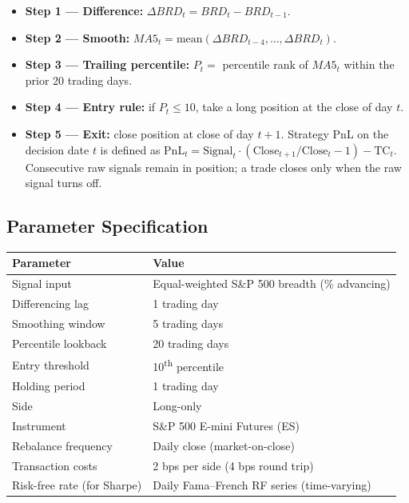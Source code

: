 \documentclass[11pt]{article}
\begin{document}
\begin{itemize}
\item \textbf{Step 1 --- Difference:}
  $\Delta BRD_t = BRD_t - BRD_{t-1}$.
\item \textbf{Step 2 --- Smooth:}
  $MA5_t = \text{mean}(\Delta BRD_{t-4}, \ldots, \Delta BRD_t)$.
\item \textbf{Step 3 --- Trailing percentile:}
  $P_t = $ percentile rank of $MA5_t$ within the prior 20 trading days.
\item \textbf{Step 4 --- Entry rule:}
  if $P_t \leq 10$, take a long position at the close of day $t$.
\item \textbf{Step 5 --- Exit:}
  close position at close of day $t{+}1$. Strategy PnL on the decision date
  $t$ is defined as
  $\text{PnL}_t = \text{Signal}_t \cdot (\text{Close}_{t+1}/\text{Close}_t - 1) - \text{TC}_t$.
  Consecutive raw signals remain in position; a trade closes only when the
  raw signal turns off.
\end{itemize}

\subsection{Parameter Specification}

\begin{center}
\small
\begin{tabular}{l l}
\toprule
\textbf{Parameter} & \textbf{Value}\\
\midrule
Signal input                 & Equal-weighted S\&P 500 breadth (\% advancing)\\
Differencing lag             & 1 trading day\\
Smoothing window             & 5 trading days\\
Percentile lookback          & 20 trading days\\
Entry threshold              & 10\textsuperscript{th} percentile\\
Holding period               & 1 trading day\\
Side                         & Long-only\\
Instrument                   & S\&P 500 E-mini Futures (ES)\\
Rebalance frequency          & Daily close (market-on-close)\\
Transaction costs            & 2 bps per side (4 bps round trip)\\
Risk-free rate (for Sharpe)  & Daily Fama--French RF series (time-varying)\\
\bottomrule
\end{tabular}
\end{center}
\newpage
\end{document}
